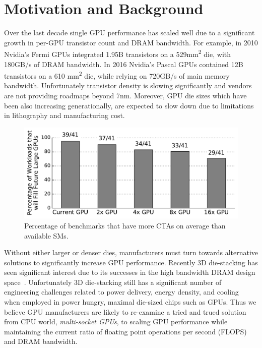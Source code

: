 \section{Motivation and Background}
\label{sec:background}

Over the last decade single GPU performance has scaled well due to a 
significant growth in per-GPU transistor count and DRAM bandwidth. For example, 
in 2010 Nvidia's Fermi GPUs integrated 1.95B transistors on a 
529mm\textsuperscript{2} die, with 180GB/s of DRAM bandwidth.  In 2016 Nvidia's 
Pascal GPUs contained 12B transistors on a 610 mm\textsuperscript{2} die, while 
relying on 720GB/s of main memory bandwidth. Unfortunately transistor density is 
slowing significantly and vendors are not providing roadmaps beyond 7nm. 
Moreover, GPU die sizes which have been also increasing generationally, are 
expected to slow down due to limitations in lithography and manufacturing cost.

\begin{figure}[t] 
    \centering
    \includegraphics[width=1.0\columnwidth]{figures/plot_ctas_per_sm.pdf}
    \caption{Percentage of benchmarks that have more CTAs on average than 
available SMs.}
    \label{fig:ctas}
\end{figure}

Without either larger or denser dies, manufacturers must turn towards 
alternative solutions to significantly increase GPU performance.  Recently 3D 
die-stacking has seen significant interest due to its successes in the high 
bandwidth DRAM design space~\cite{HBM}. Unfortunately 3D die-stacking still has 
a significant number of engineering challenges related to power delivery, 
energy density, and cooling~\cite{verbree2010cost} when employed in power 
hungry, maximal die-sized chips such as GPUs. Thus we believe GPU manufacturers 
are likely to re-examine a tried and trued solution from CPU world, 
\textit{multi-socket GPUs}, to scaling GPU performance while maintaining the 
current ratio of floating point operations per second (FLOPS) and DRAM 
bandwidth.

